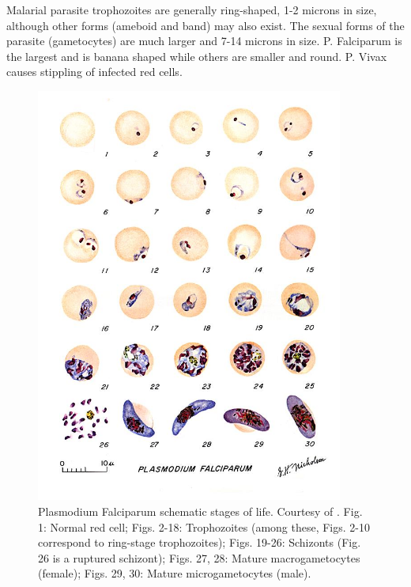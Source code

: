 Malarial parasite trophozoites are generally ring-shaped, 1-2 microns in size, although other forms (ameboid and band) may also exist. The sexual forms of the parasite (gametocytes) are much larger and 7-14 microns in size. P. Falciparum is the largest and is banana shaped while others are smaller and round. P. Vivax causes stippling of infected red cells.
\begin{figure}[!htbp]
	\centering
	\includegraphics[width=0.90\textwidth]{images/malaria_th/mal_falc}
	\caption[Plasmodium Falciparum's stages of life.]{\label{fig:falci_th} Plasmodium Falciparum schematic stages of life. Courtesy of \cite{Med_cdc}.
		Fig. 1: Normal red cell; Figs. 2-18: Trophozoites (among these, Figs. 2-10 correspond to ring-stage trophozoites); Figs. 19-26: Schizonts (Fig. 26 is a ruptured schizont); Figs. 27, 28: Mature macrogametocytes (female); Figs. 29, 30: Mature microgametocytes (male).}
\end{figure}

